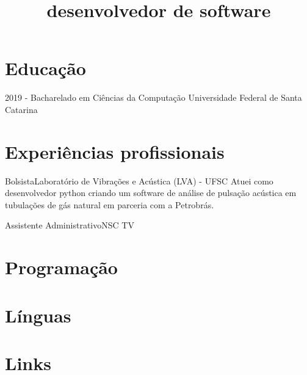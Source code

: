 \documentclass[11pt, a4paper]{moderncv}
\title{desenvolvedor de software}
\begin{document}
\makecvtitle{ }
\pagestyle{empty}

\section{Educação}
    \cventry
        {2019 -}
        {Bacharelado em Ciências da Computação}
        {}{}{}
        {Universidade Federal de Santa Catarina}

\section{Experiências profissionais}
        {Bolsista}{Laboratório de Vibrações e Acústica (LVA) - UFSC}
        {}{}
        {
            Atuei como desenvolvedor python criando um software de análise de pulsação acústica em tubulações de gás natural em parceria com a Petrobrás.
        }
        
        {Assistente Administrativo}{NSC TV}
        {}{}{}


\section{Programação}

\section{Línguas}
    
\section{Links}

    
    
\thispagestyle{plain}
\end{document}
